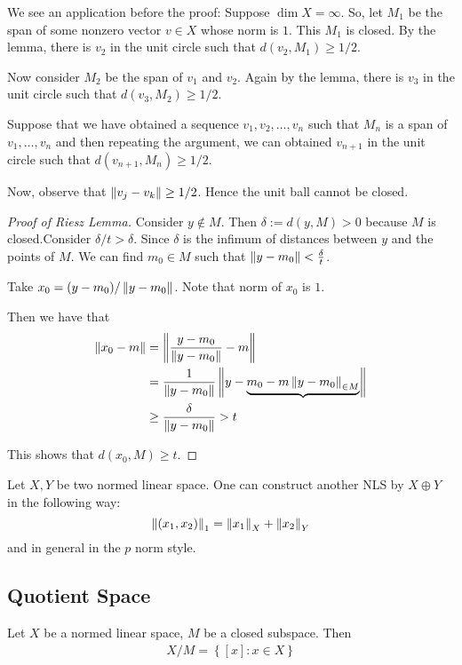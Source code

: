 We see an application before the proof:
Suppose $\dim X = \infty$. So, let $M_{1}$ be the span of some nonzero vector $v\in X$ whose norm is $1$. This $M_1$ is closed. By the lemma, there is $v_{2}$ in the unit circle such that $d\left( v_{2}, M_{1} \right) \ge 1/2$.

Now consider $M_{2}$ be the span of $v_{1}$ and $v_{2}$. Again by the lemma, there is $v_{3}$ in the unit circle such that $d \left( v_{3} , M_{2} \right) \ge 1/2$.

Suppose that we have obtained a sequence $v_{1}, v_{2}, \ldots, v_{n}$ such that $M_{n}$ is a span of $v_{1}, \ldots , v_{n}$ and then repeating the argument, we can obtained $v_{n+1}$ in the unit circle such that $d \left( v_{n+1} , M_{n} \right) \ge 1/2$.

Now, observe that $\left\lVert v_{j} - v_{k} \right\rVert \ge 1/2$. Hence the unit ball cannot be closed.

\begin{proof}[Proof of Riesz Lemma]
    Consider $y \not \in M$. Then $\delta := d(y, M) > 0$ because $M$ is closed.Consider $\delta /t > \delta$. Since $\delta$ is the infimum of distances between $y$ and the points of $M$. We can find $m_{0} \in M$ such that $\left\lVert y-m_{0}  \right\rVert< \frac{\delta}{t}$.

    Take $x_{0} = (y-m_{0})/\left\lVert y-m_{0} \right\rVert$. Note that norm of $x_{0}$ is $1$.

    Then we have that 
    \begin{align*}
	\left\lVert x_{0} - m \right\rVert &= \left\lVert \frac{y-m_{0}}{\left\lVert y-m_{0} \right\rVert} - m  \right\rVert \\
	&= \frac{1}{\left\lVert y-m_{0} \right\rVert} \left\lVert y-\underbrace{m_{0}- m \left\lVert y-m_{0} \right\rVert_{\in M}} \right\rVert \\
	    &\ge \frac{\delta}{ \left\lVert y-m_{0} \right\rVert} >t
    \end{align*}

This shows that $d \left( x_{0}, M \right) \ge t$.
\end{proof}

Let $X, Y$ be two normed linear space. One can construct another NLS by $X \oplus Y$ in the following way:
\begin{equation*}
    \left\lVert \left( x_{1} , x_{2} \right) \right\rVert_{1} = \left\lVert x_{1} \right\rVert_{X} + \left\lVert x_{2} \right\rVert_{Y} 
\end{equation*}
and in general in the $p$ norm style.

\subsection{Quotient Space}
Let $X$ be a normed linear space, $M$ be a closed subspace. Then
\begin{align*}
    X/M = \left\{ [x] : x\in X \right\}
\end{align*}

